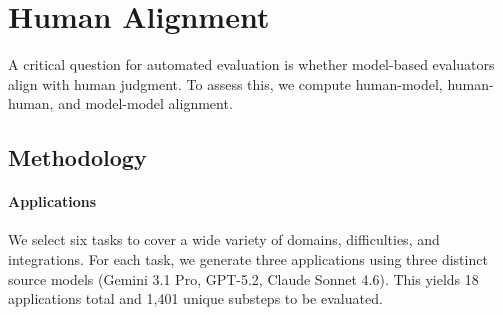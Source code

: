 \section{Human Alignment}
\label{sec:alignment}
\begin{table}[!h]
\caption{Pairwise step-level agreement (\%) across model and human evaluators.}
\label{tab:alignment_step_aggregate}
\centering
{}
\end{table}

A critical question for automated evaluation is whether model-based evaluators align with human judgment. To assess this, we compute human-model, human-human, and model-model alignment.

\subsection{Methodology}

\paragraph{Applications} We select six tasks to cover a wide variety of domains, difficulties, and integrations. For each task, we generate three applications using three distinct source models (Gemini 3.1 Pro, GPT-5.2, Claude Sonnet 4.6). This yields 18 applications total and 1,401 unique substeps to be evaluated.

